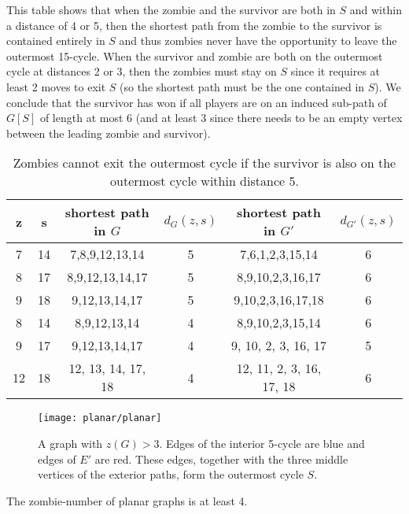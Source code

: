 This table shows that when the zombie and the survivor are both in $S$ and within a distance of 4 or 5, then the shortest path from the zombie to the survivor is contained entirely in $S$ and thus zombies never have the opportunity to leave the outermost 15-cycle.
When the survivor and zombie are both on the outermost cycle at distances 2 or 3, then the zombies must stay on $S$ since it requires at least 2 moves to exit $S$ (so the shortest path must be the one contained in $S$). We conclude that the survivor has won if all players are on an induced sub-path of $G[S]$ of length at most 6 (and at least 3 since there needs to be an empty vertex between the leading zombie and survivor).

\begin{table}
\centering
\begin{tabular}{c | c | c | c | c | c}
z & s & shortest path in $G$ & $d_{G}(z,s)$ & shortest path in $G'$ & $d_{G'}(z,s)$  \\
\hline
7 & 14 & 7,8,9,12,13,14 & 5 & 7,6,1,2,3,15,14 & 6 \\
8 & 17 & 8,9,12,13,14,17 & 5 & 8,9,10,2,3,16,17 & 6 \\
9 & 18 & 9,12,13,14,17 & 5 & 9,10,2,3,16,17,18 & 6 \\
\hline
8 & 14 & 8,9,12,13,14 & 4 & 8,9,10,2,3,15,14 & 6 \\
9 & 17 & 9,12,13,14,17 & 4 & 9, 10, 2, 3, 16, 17 & 5 \\
12 & 18 & 12, 13, 14, 17, 18 & 4 & 12, 11, 2, 3, 16, 17, 18 & 6
\end{tabular}
\caption{Zombies cannot exit the outermost cycle if the survivor is also on the outermost cycle within distance 5.\label{table outermost cycle}}
\end{table}

\begin{figure}
\centering
\texttt{[image: planar/planar]}
\caption{A graph with $z(G) > 3$. Edges of the interior 5-cycle are blue and edges of $E'$ are red. These edges, together with the three middle vertices of the exterior paths, form the outermost cycle $S$. \label{fig:planar}}
\end{figure}

\begin{theorem}
  The zombie-number of planar graphs is at least 4.
\end{theorem}

